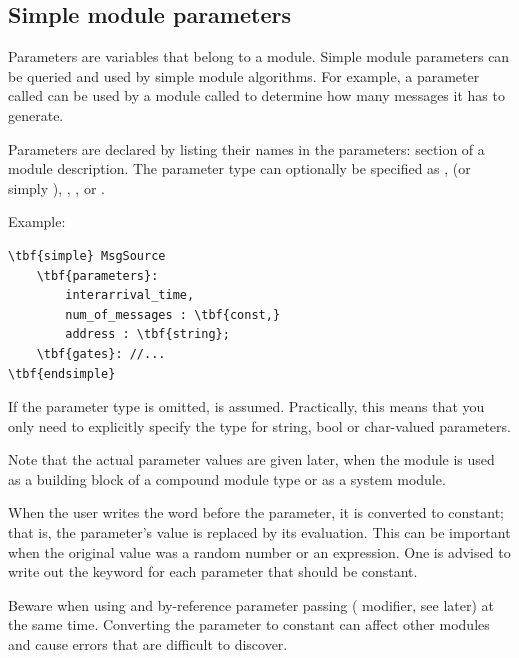 \subsection{Simple module parameters}
\label{sec:ch-ned-lang:simple-module-param}


Parameters are variables that belong to a module. Simple module
parameters can be queried and used by simple module algorithms.
For example, a parameter called  can be used
by a module called  to determine how many messages it
has to generate.


Parameters are declared by listing their names in the
parameters: section of a
module description. The parameter type can optionally be specified as
,  (or simply ),
, , or
.


Example:

\begin{Verbatim}[commandchars=\\\{\}]
\tbf{simple} MsgSource
    \tbf{parameters}:
        interarrival_time,
        num_of_messages : \tbf{const,}
        address : \tbf{string};
    \tbf{gates}: //...
\tbf{endsimple}
\end{Verbatim}

If the parameter type is omitted, 
is assumed. Practically, this means that you only need to explicitly
specify the type for string, bool or char-valued parameters.

Note that the actual parameter values are given later, when the module
is used as a building block of a compound module type or as a system
module.

When the user writes the word  before
the parameter, it is converted to constant; that is, the parameter's
value is replaced by its evaluation. This can be important when the
original value was a random number or an
expression. One is advised to write out the
 keyword for each parameter that
should be constant.

Beware when using  and by-reference
parameter passing ( modifier, see later)
at the same time. Converting the parameter to constant can affect
other modules and cause errors that are difficult to discover.





